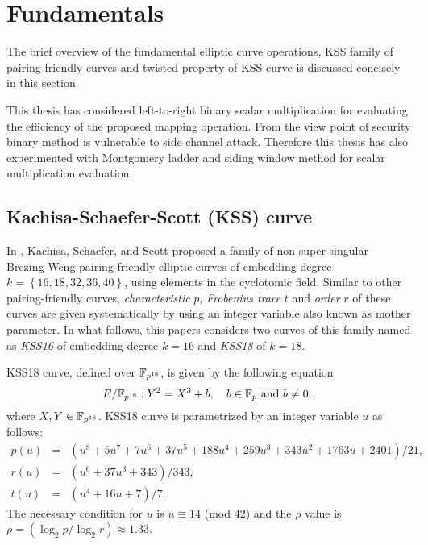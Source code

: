 \section{Fundamentals}
The brief overview of the fundamental elliptic curve operations, KSS family of pairing-friendly curves and twisted property of KSS curve is discussed concisely in this section.


This thesis has considered left-to-right binary scalar multiplication for evaluating the efficiency of the proposed mapping operation. From the view point of security binary method is vulnerable to side channel attack. Therefore this thesis has also experimented with Montgomery ladder \cite{Silverman} and siding window method for scalar multiplication evaluation.

\subsection{Kachisa-Schaefer-Scott (KSS) curve \cite{EPRINT:KacSchSco07}}
 In \cite{EPRINT:KacSchSco07}, Kachisa, Schaefer, and Scott proposed a family of non super-singular Brezing-Weng pairing-friendly elliptic curves of embedding degree $k = \left\lbrace16, 18, 32, 36, 40\right\rbrace$, using elements in the cyclotomic field. Similar to other pairing-friendly curves,  \textit{characteristic} $p$, \textit{Frobenius trace} $t$ and \textit{order} $r$ of these curves are given systematically by using an integer variable also known as mother parameter. In what follows, this papers considers two curves of this family named as \textit{KSS16} of embedding degree $k =16$  and \textit{KSS18} of $k=18$. 

KSS18 curve, defined over $\mathbb{F}_{p^{18}}$, is given by the following equation
\begin{equation}\label{eq:KSS_curve_18}
E/\mathbb{F}_{p^{18}}:Y^2=X^3+b, \quad \mbox{$b \in {\mathbb{F}}_{p}$ and $b \neq 0$ },
\end{equation}
where  $X,Y \in \mathbb{F}_{p^{18}}$. KSS18 curve is parametrized by an integer variable $u$ as follows:
\begin{subequations}
\begin{eqnarray}
p(u) & = & (u^8 +5u^7 +7u^6 +37u^5 +188u^4 +259u^3 + 343u^2 +1763u+2401)/21,\\\label{eq:kss_char}
r(u)  &=&  (u^6 + 37u^3 + 343)/343,\label{eq:kss_degree}  \\
t(u) &= & (u^4 + 16u + 7)/7. \label{eq:kss_trace} 
\end{eqnarray}
\end{subequations} 
The necessary condition for $u$ is $u \equiv 14$ (mod $42$) and the $\rho$ value is $\rho = (\log_2 p/\log_2 r) \approx 1.33$.

